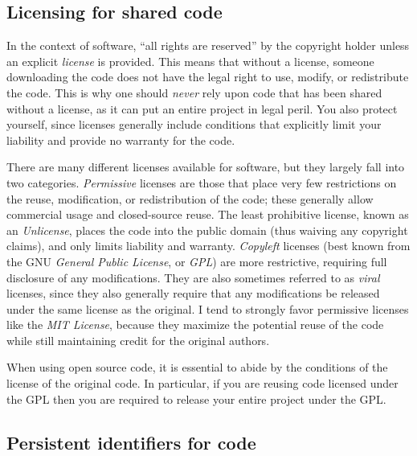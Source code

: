 \subsection{Licensing for shared code}

In the context of software, ``all rights are reserved'' by the copyright holder unless an explicit \textit{license} is provided.  This means that without a license, someone downloading the code does not have the legal right to use, modify, or redistribute the code.  This is why one should \textit{never} rely upon code that has been shared without a license, as it can put an entire project in legal peril.  You also protect yourself, since licenses generally include conditions that explicitly limit your liability and provide no warranty for the code.

There are many different licenses available for software, but they largely fall into two categories.  \textit{Permissive} licenses are those that place very few restrictions on the reuse, modification, or redistribution of the code; these generally allow commercial usage and closed-source reuse.  The least prohibitive license, known as an \textit{Unlicense}, places the code into the public domain (thus waiving any copyright claims), and only limits liability and warranty. \textit{Copyleft} licenses (best known from the GNU \textit{General Public License}, or \textit{GPL}) are more restrictive, requiring full disclosure of any modifications.  They are also sometimes referred to as \textit{viral} licenses, since they also generally require that any modifications be released under the same license as the original.  I tend to strongly favor permissive licenses like the \textit{MIT License}, because they maximize the potential reuse of the code while still maintaining credit for the original authors.

When using open source code, it is essential to abide by the conditions of the license of the original code.  In particular, if you are reusing code licensed under the GPL then you are required to release your entire project under the GPL.

\subsection{Persistent identifiers for code}

